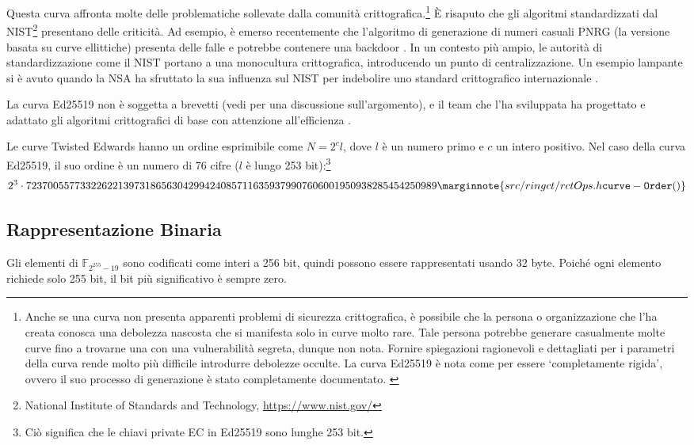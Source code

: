 Questa curva affronta molte delle problematiche sollevate dalla comunità crittografica.\footnote{Anche se una curva non presenta apparenti problemi di sicurezza crittografica, è possibile che la persona o organizzazione che l’ha creata conosca una debolezza nascosta che si manifesta solo in curve molto rare. Tale persona potrebbe generare casualmente molte curve fino a trovarne una con una vulnerabilità segreta, dunque non nota. Fornire spiegazioni ragionevoli e dettagliati per i parametri della curva rende molto più difficile introdurre debolezze occulte. La curva Ed25519 è nota come per essere `completamente rigida', ovvero il suo processo di generazione è stato completamente documentato. \cite{elliptic-curve-rigidity}} È risaputo che gli algoritmi standardizzati dal NIST\footnote{\label{NIST_note}National Institute of Standards and Technology, \url{https://www.nist.gov/}} 
presentano delle criticità. Ad esempio, è emerso recentemente che l’algoritmo di generazione di numeri casuali PNRG (la versione basata su curve ellittiche) presenta delle falle e potrebbe contenere una backdoor \cite{hales2014nsa}. In un contesto più ampio, le autorità di standardizzazione come il NIST portano a una monocultura crittografica, introducendo un punto di centralizzazione. Un esempio lampante si è avuto quando la NSA ha sfruttato la sua influenza sul NIST per indebolire uno standard crittografico internazionale \cite{NSA-NIST}.

La curva Ed25519 non è soggetta a brevetti (vedi \cite{ECC-patents} per una discussione sull’argomento), e il team che l’ha sviluppata ha
progettato e adattato gli algoritmi crittografici di base con attenzione all’efficienza \cite{Bernstein2007}.

Le curve Twisted Edwards hanno un ordine esprimibile come \(N=2^c l\), dove \(l\) è un numero primo e \(c\) un intero positivo. Nel caso della curva Ed25519, il suo ordine è un numero di 76 cifre ($l$ è lungo 253 bit):\footnote{Ciò significa che le chiavi private EC in Ed25519 sono lunghe 253 bit.}\vspace{.175cm}
\[2^3 \cdot 7237005577332262213973186563042994240857116359379907606001950938285454250989\marginnote{src/ringct/ rctOps.h {\tt curve- Order()}}\]


\subsection{Rappresentazione Binaria}
\label{binary_note}
Gli elementi di \(\mathbb{F}_{2^{255} - 19} \) sono codificati come interi a 256 bit, quindi possono essere rappresentati usando 32 byte. Poiché ogni elemento richiede solo 255 bit, il bit più significativo è sempre zero.

